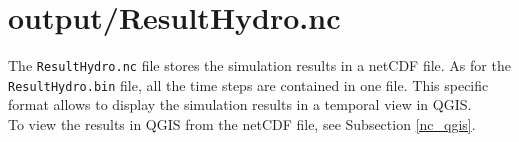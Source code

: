 \section{output/ResultHydro.nc}

The \texttt{ResultHydro.nc} file stores the simulation results in a netCDF file.
As for the \texttt{ResultHydro.bin} file, all the time steps are contained in one file.
This specific format allows to display the simulation results in a temporal view in QGIS.\\

To view the results in QGIS from the netCDF file, see Subsection \ref{nc_qgis}.

